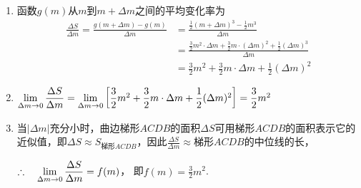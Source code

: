 \begin{solution}
\begin{enumerate}[(1)]
    \item 函数$g(m)$从$m$到$m+\Delta m$之间的平均变化率为
\[\begin{split}
\frac{\Delta S}{\Delta m}=\frac{g(m+\Delta m)-g(m)}{\Delta m}&=\frac{\frac{1}{2}(m+\Delta m)^3-\frac{1}{2}m^3}{\Delta m}\\
&=\frac{\frac{3}{2}m^2\cdot \Delta m+\frac{3}{2}m\cdot (\Delta m)^2+\frac{1}{2}(\Delta m)^3}{\Delta m}\\
&=\frac{3}{2}m^2+\frac{3}{2}m\cdot \Delta m+\frac{1}{2}(\Delta m)^2
\end{split}\]

\item $\lim\limits_{\Delta m\to 0}\dfrac{\Delta S}{\Delta m}=\lim\limits_{\Delta m\to 0}\left[\dfrac{3}{2}m^2+\dfrac{3}{2}m\cdot \Delta m+\dfrac{1}{2}(\Delta m)^2\right]=\dfrac{3}{2}m^2$

\item  当$|\Delta m|$充分小时，曲边梯形$ACDB$的面积$\Delta S$可用梯形$ACDB$的面积表示它的近似值，即$\Delta S\approx S_{\text{梯形}ACDB}$，因此$\frac{\Delta S}{\Delta m}\approx \text{梯形}ACDB$的中位线的长，

$\therefore\quad \lim\limits_{\Delta m\to 0}\dfrac{\Delta S}{\Delta m}=f(m)$，
即$f(m)=\frac{3}{2}m^2$.
\end{enumerate}
\end{solution}

